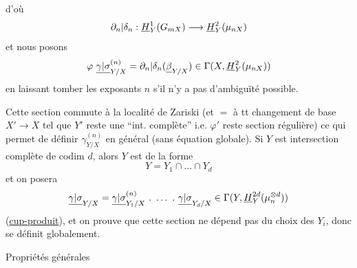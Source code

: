 d'où
\[
\relax{\partial_n|\delta_n}:\underline H^1_Y(G_{mX})\longrightarrow\underline H^2_Y(\mu_{nX})
\]
et nous posons
\[
\deleted{\unsure{\varphi}}\ \underline{\unsure{\gamma|\sigma}}_{Y/X}^{(n)}=\unsure{\partial_n|\delta_n}(\underline\beta_{Y/X})\in\Gamma(X,\underline H^2_Y(\mu_{nX}))
\]
en laissant tomber les exposants $n$ s'il n'y a pas d'ambiguïté possible.

 Cette section  commute à la localité de Zariski (et $=$ à tt changement de base $X'\to X$ tel que $Y'$ reste une ``int. complète'' i.e. $\varphi'$ reste section régulière) ce qui permet de définir $\gamma_{Y/X}^{(n)}$ en général (sans équation globale). Si  $Y$ est intersection complète de codim $d$, alors  $Y$ est de la forme
\[
Y=Y_1\cap\ldots\cap Y_d
\]
et on posera
\[
\underline{\unsure{\gamma|\sigma}}_{Y/X}
=\underline{\unsure{\gamma|\sigma}}_{Y_1/X}^{\deleted{\unsure{(n)}}}\ .\ \ldots\ .\ \underline{\unsure{\gamma|\sigma}}_{Y_d/X}
\in\Gamma(Y,\underline H^{2d}_Y(\mu_n^{\otimes d}))
\]
(\uline{cup-produit}), et on prouve que cette section ne dépend pas du choix des $Y_i$, donc se définit globalement.

Propriétés générales
